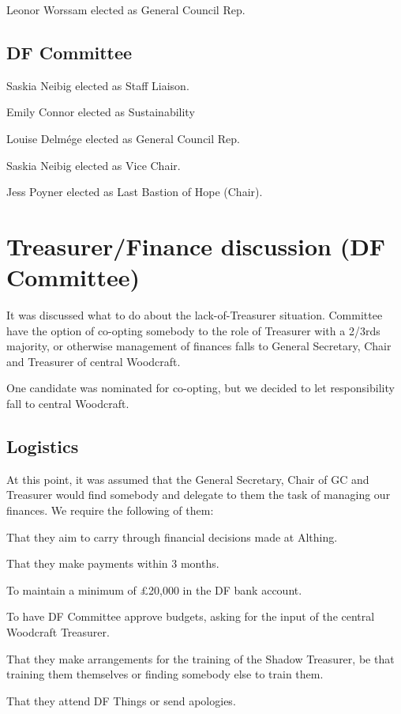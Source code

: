 \documentclass[a4paper, 12pt]{article}
\begin{document}
Leonor Worssam elected as General Council Rep.

\subsection{DF Committee}
Saskia Neibig elected as Staff Liaison.

Emily Connor elected as Sustainability

Louise Delmége elected as General Council Rep.

Saskia Neibig elected as Vice Chair.

Jess Poyner elected as Last Bastion of Hope (Chair).

\section{Treasurer/Finance discussion (DF Committee)}
It was discussed what to do about the lack-of-Treasurer situation. Committee have the option of co-opting somebody to the role of Treasurer with a 2/3rds majority, or otherwise management of finances falls to General Secretary, Chair and Treasurer of central Woodcraft.

One candidate was nominated for co-opting, but we decided to let responsibility fall to central Woodcraft.

\subsection{Logistics}
At this point, it was assumed that the General Secretary, Chair of GC and Treasurer would find somebody and delegate to them the task of managing our finances. We require the following of them:
\begin{itemize*}
	\item That they aim to carry through financial decisions made at Althing.
	\item That they make payments within 3 months.
	\item To maintain a minimum of £20,000 in the DF bank account.
	\item To have DF Committee approve budgets, asking for the input of the central Woodcraft Treasurer.
	\item That they make arrangements for the training of the Shadow Treasurer, be that training them themselves or finding somebody else to train them.
	\item That they attend DF Things or send apologies.
\end{itemize*}
\end{document}
